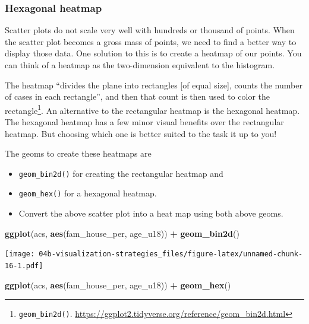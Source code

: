 \documentclass[
]{book}
\newenvironment{Shaded}{\begin{snugshade}}{\end{snugshade}}
\newcommand{\KeywordTok}[1]{\textcolor[rgb]{0.13,0.29,0.53}{\textbf{#1}}}
\newcommand{\NormalTok}[1]{#1}
\newcommand{\OperatorTok}[1]{\textcolor[rgb]{0.81,0.36,0.00}{\textbf{#1}}}
\newcommand{\StringTok}[1]{\textcolor[rgb]{0.31,0.60,0.02}{#1}}
\begin{document}
\hypertarget{hexagonal-heatmap}{%
\subsubsection{Hexagonal heatmap}\label{hexagonal-heatmap}}

Scatter plots do not scale very well with hundreds or thousand of points. When the scatter plot becomes a gross mass of points, we need to find a better way to display those data. One solution to this is to create a heatmap of our points. You can think of a heatmap as the two-dimension equivalent to the histogram.

The heatmap ``divides the plane into rectangles {[}of equal size{]}, counts the number of cases in each rectangle'', and then that count is then used to color the rectangle\footnote{\texttt{geom\_bin2d()}. \url{https://ggplot2.tidyverse.org/reference/geom_bin2d.html}}. An alternative to the rectangular heatmap is the hexagonal heatmap. The hexagonal heatmap has a few minor visual benefits over the rectangular heatmap. But choosing which one is better suited to the task it up to you!

The geoms to create these heatmaps are

\begin{itemize}
\item
  \texttt{geom\_bin2d()} for creating the rectangular heatmap and
\item
  \texttt{geom\_hex()} for a hexagonal heatmap.
\item
  Convert the above scatter plot into a heat map using both above geoms.
\end{itemize}

\begin{Shaded}
\begin{Highlighting}[]
\KeywordTok{ggplot}\NormalTok{(acs, }\KeywordTok{aes}\NormalTok{(fam\_house\_per, age\_u18)) }\OperatorTok{+}
\StringTok{  }\KeywordTok{geom\_bin2d}\NormalTok{()}
\end{Highlighting}
\end{Shaded}

\texttt{[image: 04b-visualization-strategies\_files/figure-latex/unnamed-chunk-16-1.pdf]}

\begin{Shaded}
\begin{Highlighting}[]
\KeywordTok{ggplot}\NormalTok{(acs, }\KeywordTok{aes}\NormalTok{(fam\_house\_per, age\_u18)) }\OperatorTok{+}
\StringTok{  }\KeywordTok{geom\_hex}\NormalTok{()}
\end{Highlighting}
\end{Shaded}
\end{document}
